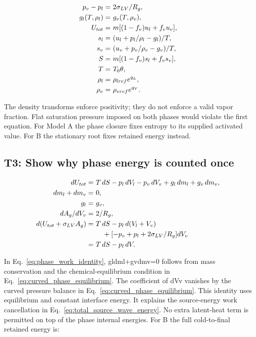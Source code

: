 \documentclass[11pt]{article}
\begin{document}
\begin{align}
p_v-p_l= & ~2\sigma_{LV}/R_g, \notag \\
g_l(T,\rho_l)= & ~g_v(T,\rho_v), \notag \\
U_{tot}= & ~m[(1-f_v)u_l+f_vu_v], \notag \\
s_l= & ~(u_l+p_l/\rho_l-g_l)/T, \notag \\
s_v= & ~(u_v+p_v/\rho_v-g_v)/T, \notag \\
S= & ~m[(1-f_v)s_l+f_vs_v], \notag \\
T= & ~T_0\theta, \notag \\
\rho_l= & ~\rho_{lref}e^{q_L}, \notag \\
\rho_v= & ~\rho_{vref}e^{q_V}. \label{eq:curved_phase_equilibrium}
\end{align}

The density transforms enforce positivity; they do not enforce a valid vapor fraction. Flat saturation pressure imposed on both phases would violate the first equation. For Model A the phase closure fixes entropy to its supplied activated value. For B the stationary root fixes retained energy instead.

\subsection{T3: Show why phase energy is counted once}

\begin{align}
dU_{tot}= & ~T\,dS-p_l\,dV_l-p_v\,dV_v+g_l\,dm_l+g_v\,dm_v, \notag \\
dm_l+dm_v= & ~0, \notag \\
g_l= & ~g_v, \notag \\
dA_g/dV_v= & ~2/R_g, \notag \\
d(U_{tot}+\sigma_{LV}A_g)= & ~T\,dS-p_l\,d(V_l+V_v) \notag \\
& ~\quad+[-p_v+p_l+2\sigma_{LV}/R_g]dV_v \notag \\
= & ~T\,dS-p_l\,dV. \label{eq:phase_work_identity}
\end{align}

In Eq.~\eqref{eq:phase_work_identity}, gldml+gvdmv=0 follows from mass conservation and the chemical-equilibrium condition in Eq.~\eqref{eq:curved_phase_equilibrium}. The coefficient of dVv vanishes by the curved pressure balance in Eq.~\eqref{eq:curved_phase_equilibrium}. This identity uses equilibrium and constant interface energy. It explains the source-energy work cancellation in Eq.~\eqref{eq:total_source_wave_energy}. No extra latent-heat term is permitted on top of the phase internal energies. For B the full cold-to-final retained energy is:
\end{document}
